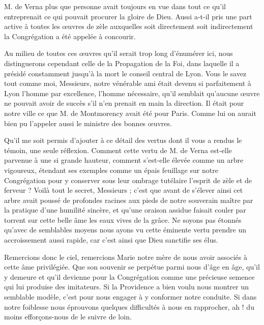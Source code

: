 M. de Verna plus que personne avait toujours en vue dans tout ce qu'il entreprenait ce qui pouvait procurer la gloire de Dieu. Aussi a-t-il pris une part active à toutes les œuvres de zèle auxquelles soit directement soit indirectement la Congrégation a été appelée à concourir.

Au milieu de toutes ces œuvres qu'il serait trop long d'énumérer ici, nous distinguerons cependant celle de la Propagation de la Foi, dans laquelle il a présidé constamment jusqu'à la mort le conseil central de Lyon. Vous le savez tout comme moi, Messieurs, notre vénérable ami était devenu si parfaitement à Lyon l'homme par excellence, l'homme nécessaire, qu'il semblait qu'aucune œuvre ne pouvait avoir de succès s'il n'en prenait en main la direction. Il était pour notre ville ce que M. de Montmorency avait été pour Paris. Comme lui on aurait bien pu l'appeler aussi le ministre des bonnes œuvres.

Qu'il me soit permis d'ajouter à ce détail des vertus dont il vous a rendus le témoin, une seule réflexion. Comment cette vertu de M. de Verna est-elle parvenue à une si grande hauteur,
comment s'est-elle élevée comme un arbre vigoureux, étendant ses exemples comme un épais feuillage sur notre Congrégation pour y conserver sous leur ombrage tutélaire l'esprit de zèle et de ferveur ? Voilà tout le secret, Messieurs ; c'est que avant de s'élever ainsi cet arbre avait poussé de profondes racines aux pieds de notre souverain maître par la pratique d'une humilité sincère, et qu'une oraison assidue faisait couler par torrent sur cette belle âme les eaux vives de la grâce. Ne soyons pas étonnés qu'avec de semblables moyens nous ayons vu cette éminente vertu prendre un accroissement aussi rapide, car c'est ainsi que Dieu sanctifie ses élus.

Remercions donc le ciel, remercions Marie notre mère de nous avoir associés à cette âme privilégiée. Que son souvenir se perpétue parmi nous d'âge en âge, qu'il y demeure et qu'il devienne pour la Congrégation comme une précieuse semence qui lui produise des imitateurs. Si la Providence a bien voulu nous montrer un semblable modèle, c'est pour nous engager à y conformer notre conduite. Si dans notre foiblesse nous éprouvons quelques difficultés à nous en rapprocher, ah ! du moins efforçons-nous de le suivre de loin.

